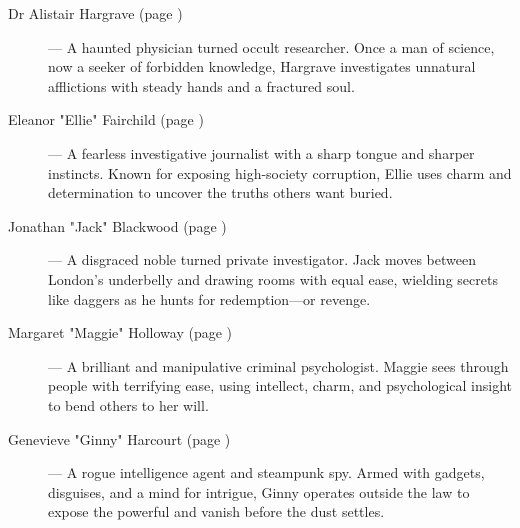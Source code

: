 \begin{description}
    \item[Dr Alistair Hargrave (page \pageref{pc:alistair-hargrave})] --- A haunted physician turned occult researcher. Once a man of science, now a seeker of forbidden knowledge, Hargrave investigates unnatural afflictions with steady hands and a fractured soul.

    \item[Eleanor "Ellie" Fairchild (page \pageref{pc:eleanor-fairchild})] --- A fearless investigative journalist with a sharp tongue and sharper instincts. Known for exposing high-society corruption, Ellie uses charm and determination to uncover the truths others want buried.

    \item[Jonathan "Jack" Blackwood (page \pageref{pc:jack-blackwood})] --- A disgraced noble turned private investigator. Jack moves between London's underbelly and drawing rooms with equal ease, wielding secrets like daggers as he hunts for redemption—or revenge.

    \item[Margaret "Maggie" Holloway (page \pageref{pc:maggie-holloway})] --- A brilliant and manipulative criminal psychologist. Maggie sees through people with terrifying ease, using intellect, charm, and psychological insight to bend others to her will.

    \item[Genevieve "Ginny" Harcourt (page \pageref{pc:ginny-harcourt})] --- A rogue intelligence agent and steampunk spy. Armed with gadgets, disguises, and a mind for intrigue, Ginny operates outside the law to expose the powerful and vanish before the dust settles.
\end{description}
    
\newpage

